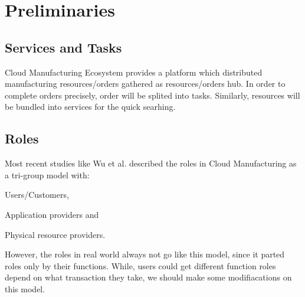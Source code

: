 \section{Preliminaries} %
 
\subsection{Services and Tasks}
Cloud Manufacturing Ecosystem provides a platform which distributed manufacturing resources/orders gathered as resources/orders hub. In order to complete orders precisely, order will be splited into tasks. Similarly, resources will be bundled into services for the quick searhing.

\subsection{Roles}
Most recent studies like Wu et al.\cite{Wu2013} described the roles in Cloud Manufacturing as a tri-group model with:\begin{inparaenum}[1)]
\item Users/Customers,
\item Application providers and
\item Physical resource providers.
\end{inparaenum}
However, the roles in real world always not go like this model, since it parted roles only by their functions. While, users could get different function roles depend on what transaction they take, we should make some modifiacations on this model.

